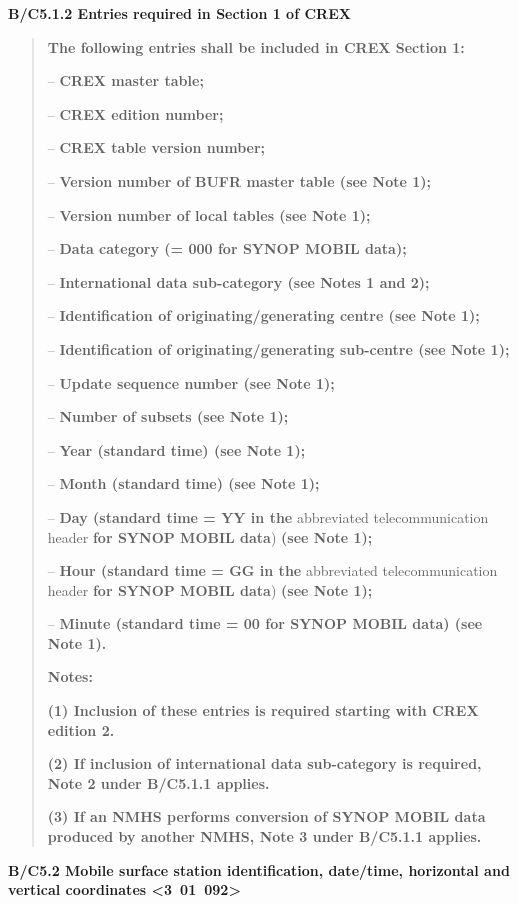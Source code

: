\textbf{B/C5.1.2 Entries required in Section 1 of CREX}

\begin{quote}
\textbf{The following entries shall be included in CREX Section 1:}

-- \textbf{CREX master table;}

-- \textbf{CREX edition number;}

-- \textbf{CREX table version number;}

-- \textbf{Version number of BUFR master table (see Note 1);}

-- \textbf{Version number of local tables (see Note 1);}

-- \textbf{Data category (= 000 for SYNOP MOBIL data);}

-- \textbf{International data sub-category (see Notes 1 and 2);}

-- \textbf{Identification of originating/generating centre (see Note 1);}

-- \textbf{Identification of originating/generating sub-centre (see Note 1);}

-- \textbf{Update sequence number (see Note 1);}

-- \textbf{Number of subsets (see Note 1);}

-- \textbf{Year (standard time) (see Note 1);}

-- \textbf{Month (standard time) (see Note 1);}

-- \textbf{Day (standard time = YY in the} abbreviated telecommunication header \textbf{for SYNOP MOBIL data}) \textbf{(see Note 1);}

-- \textbf{Hour (standard time = GG in the} abbreviated telecommunication header \textbf{for SYNOP MOBIL data}) \textbf{(see Note 1);}

-- \textbf{Minute (standard time = 00 for SYNOP MOBIL data) (see Note 1).}

\textbf{Notes:}

\textbf{(1) Inclusion of these entries is required starting with CREX edition 2.}

\textbf{(2) If inclusion of international data sub-category is required, Note 2 under B/C5.1.1 applies.}

\textbf{(3) If an NMHS performs conversion of SYNOP MOBIL data produced by another NMHS, Note 3 under B/C5.1.1 applies.}
\end{quote}

\textbf{B/C5.2 Mobile surface station identification, date/time, horizontal and vertical coordinates \textless3~01~092\textgreater{}}

